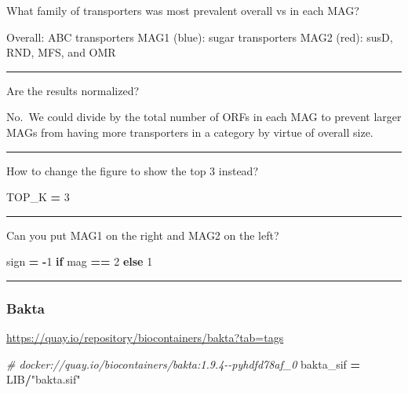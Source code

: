\documentclass[
]{book}
\newenvironment{Shaded}{\begin{snugshade}}{\end{snugshade}}
\newcommand{\CommentTok}[1]{\textcolor[rgb]{0.56,0.35,0.01}{\textit{#1}}}
\newcommand{\ControlFlowTok}[1]{\textcolor[rgb]{0.13,0.29,0.53}{\textbf{#1}}}
\newcommand{\DecValTok}[1]{\textcolor[rgb]{0.00,0.00,0.81}{#1}}
\newcommand{\NormalTok}[1]{#1}
\newcommand{\OperatorTok}[1]{\textcolor[rgb]{0.81,0.36,0.00}{\textbf{#1}}}
\newcommand{\StringTok}[1]{\textcolor[rgb]{0.31,0.60,0.02}{#1}}
\begin{document}
What family of transporters was most prevalent overall vs in each MAG?

Overall: ABC transporters
MAG1 (blue): sugar transporters
MAG2 (red): susD, RND, MFS, and OMR

\begin{center}\rule{0.5\linewidth}{0.5pt}\end{center}

Are the results normalized?

No.~We could divide by the total number of ORFs in each MAG to prevent larger MAGs from having more transporters in a category by virtue of overall size.

\begin{center}\rule{0.5\linewidth}{0.5pt}\end{center}

How to change the figure to show the top 3 instead?

\begin{Shaded}
\begin{Highlighting}[numbers=left,,]
\NormalTok{TOP\_K }\OperatorTok{=} \DecValTok{3}
\end{Highlighting}
\end{Shaded}

\begin{center}\rule{0.5\linewidth}{0.5pt}\end{center}

Can you put MAG1 on the right and MAG2 on the left?

\begin{Shaded}
\begin{Highlighting}[numbers=left,,]
\NormalTok{    sign }\OperatorTok{=} \OperatorTok{{-}}\DecValTok{1} \ControlFlowTok{if}\NormalTok{ mag }\OperatorTok{==} \DecValTok{2} \ControlFlowTok{else} \DecValTok{1}
\end{Highlighting}
\end{Shaded}

\begin{center}\rule{0.5\linewidth}{0.5pt}\end{center}

\subsubsection{Bakta}\label{bakta}

\url{https://quay.io/repository/biocontainers/bakta?tab=tags}

\begin{Shaded}
\begin{Highlighting}[numbers=left,,]
\CommentTok{\# docker://quay.io/biocontainers/bakta:1.9.4{-}{-}pyhdfd78af\_0}
\NormalTok{bakta\_sif }\OperatorTok{=}\NormalTok{ LIB}\OperatorTok{/}\StringTok{"bakta.sif"}
\end{Highlighting}
\end{Shaded}
\end{document}
